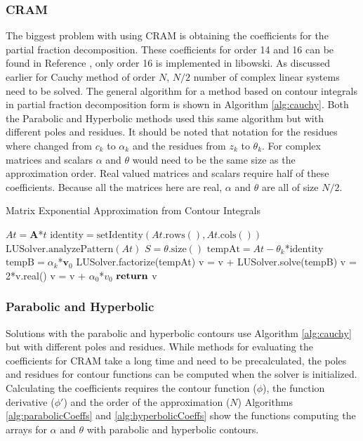 \subsubsection{CRAM}
The biggest problem with using CRAM is obtaining the coefficients for the partial fraction decomposition. These coefficients for order 14 and 16 can be found in Reference \cite{pusa2011}, only order 16 is implemented in libowski. As discussed earlier for Cauchy method of order $N$, $N/2$ number of complex linear systems need to be solved. The general algorithm for a method based on contour integrals in partial fraction decomposition form is shown in Algorithm \ref{alg:cauchy}. Both the Parabolic and Hyperbolic methods used this same algorithm but with different poles and residues. It should be noted that notation for the residues where changed from $c_{k}$ to $\alpha_{k}$ and the residues from $z_{k}$ to $\theta_{k}$. For complex matrices and scalars $\alpha$ and $\theta$ would need to be the same size as the approximation order. Real valued matrices and scalars require half of these coefficients. Because all the matrices here are real, $\alpha$ and $\theta$ are all of size $N/2$. 

\begin{algorithm}
	\caption{Matrix Exponential Approximation from Contour Integrals} 
	\begin{algorithmic}[1]
		\State $At = \boldsymbol{A}$*$t$
		\State $\text{identity} = \text{setIdentity}(At.\text{rows}(), At.\text{cols}()) $
		\State $\text{LUSolver}.\text{analyzePattern}(At)$ 
		\State $S = \theta.\text{size}()$
		    \State $\text{tempAt} = At - \theta_{k}$*$\text{identity}$
		    \State $\text{tempB} = \alpha_{k}$*$\boldsymbol{v}_{0}$
		    \State LUSolver.factorize(tempAt) 
		    \State v = v + LUSolver.solve(tempB) 
		\EndFor
		\State v = 2*v.real()
		\State v = v + $\alpha_{0}$*$v_{0}$ 
		\State ${\text{\textbf{return}}}$ v
		\EndProcedure
	\end{algorithmic} 
	\label{alg:cauchy}
\end{algorithm}


\subsubsection{Parabolic and Hyperbolic}
Solutions with the parabolic and hyperbolic contours use Algorithm \ref{alg:cauchy} but with different poles and residues. While methods for evaluating the coefficients for CRAM take a long time and need to be precalculated, the poles and residues for contour functions can be computed when the solver is initialized. Calculating the coefficients requires the contour function ($\phi$), the function derivative ($\phi'$) and the order of the approximation ($N$) Algorithms \ref{alg:parabolicCoeffs} and \ref{alg:hyperbolicCoeffs} show the functions computing the arrays for $\alpha$ and $\theta$ with parabolic and hyperbolic contours.

